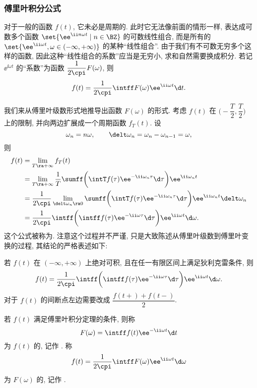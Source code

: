 \subsubsection{傅里叶积分公式}

对于一般的函数 $f(t)$, 它未必是周期的.
此时它无法像前面的情形一样, 表达成可数多个函数 $\set{\ee^{\ii n\omega t}\mid n\in\BZ}$ 的可数线性组合, 而是所有的 $\set{\ee^{\ii \omega t},\omega\in(-\infty,+\infty)}$ 的某种``线性组合''.
由于我们有不可数无穷多个这样的函数, 因此这种``线性组合的系数''应当是无穷小, 求和自然需要换成积分.
若记 $\ee^{\ii \omega t}$ 的``系数''为函数 $\dfrac1{2\cpi}F(\omega)$, 则
\[
  f(t)=\frac1{2\cpi}\intff F(\omega) \ee^{\ii \omega t}\d t.
\]

我们来从傅里叶级数形式地推导出函数 $F(\omega)$ 的形式.
考虑 $f(t)$ 在 $\biggl(-\dfrac T2,\dfrac T2\biggr)$ 上的限制, 并向两边扩展成一个周期函数 $f_T(t)$.
设
\[
  \omega_n=n\omega,\qquad \delt\omega_n=\omega_n-\omega_{n-1}=\omega,
\]
则
\begin{align*}
  f(t)&=\lim_{T\ra +\infty}f_T(t)\\
  &=\lim_{T\ra+\infty} \frac 1T \sumff 
    \biggl(\intT f(\tau)\ee^{-\ii \omega_n\tau}\d\tau\biggr)
  \ee^{\ii \omega_n t}\\
  &=\frac1{2\cpi}\lim_{\delt\omega_n\ra 0}\sumff 
    \biggl(\intT f(\tau)\ee^{-\ii \omega_n\tau} \d \tau\biggr)\ee^{\ii \omega_n t}
  \delt\omega_n\\
  &=\frac1{2\cpi}\intff 
    \biggl(\intff f(\tau) \ee^{-\ii \omega\tau} \d \tau\biggr)\ee^{\ii \omega t}
  \d\omega.
\end{align*}
这个公式被称为.
注意这个过程并不严谨, 只是大致陈述从傅里叶级数到傅里叶变换的过程, 其结论的严格表述如下:

\begin{theorem}
  若 $f(t)$ 在 $(-\infty,+\infty)$ 上绝对可积, 且在任一有限区间上满足狄利克雷条件, 则
  \begin{equation}\label{eq:fourier-integral}
    f(t)=\frac1{2\cpi}\intff 
    \biggl(\intff f(\tau) \ee^{-\ii \omega\tau} \d \tau\biggr)\ee^{\ii \omega t}
    \d\omega.
  \end{equation}
  对于 $f(t)$ 的间断点左边需要改成 $\dfrac{f(t+)+f(t-)}2$.
\end{theorem}

\begin{definition}
  若 $f(t)$ 满足傅里叶积分定理的条件, 则称
  \[
    F(\omega)=\intff f(t) \ee^{-\ii \omega t} \d t
  \]
  为 $f(t)$ 的, 记作 \noun{$\msf[f]$}.
  称
  \[
    f(t)=\frac1{2\cpi} \intff F(\omega) \ee^{\ii \omega t} \d\omega
  \]
  为 $F(\omega)$ 的, 记作 .
\end{definition}

